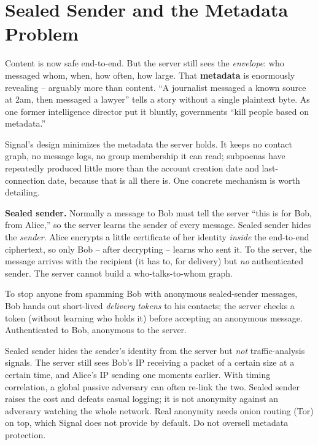 \section{Sealed Sender and the Metadata Problem}
\label{ch27:metadata}

Content is now safe end-to-end. But the server still sees the \emph{envelope}: who messaged whom, when, how often, how large. That \textbf{metadata} is enormously revealing -- arguably more than content. ``A journalist messaged a known source at 2am, then messaged a lawyer'' tells a story without a single plaintext byte. As one former intelligence director put it bluntly, governments ``kill people based on metadata.''

Signal's design minimizes the metadata the server holds. It keeps no contact graph, no message logs, no group membership it can read; subpoenas have repeatedly produced little more than the account creation date and last-connection date, because that is all there is. One concrete mechanism is worth detailing.

\begin{focusbox}
\textbf{Sealed sender.} Normally a message to Bob must tell the server ``this is for Bob, from Alice,'' so the server learns the sender of every message. Sealed sender hides the \emph{sender}. Alice encrypts a little certificate of her identity \emph{inside} the end-to-end ciphertext, so only Bob -- after decrypting -- learns who sent it. To the server, the message arrives with the recipient (it has to, for delivery) but \emph{no} authenticated sender. The server cannot build a who-talks-to-whom graph.

To stop anyone from spamming Bob with anonymous sealed-sender messages, Bob hands out short-lived \emph{delivery tokens} to his contacts; the server checks a token (without learning who holds it) before accepting an anonymous message. Authenticated to Bob, anonymous to the server.
\end{focusbox}

\begin{trapbox}
Sealed sender hides the sender's identity from the server but \emph{not} traffic-analysis signals. The server still sees Bob's IP receiving a packet of a certain size at a certain time, and Alice's IP sending one moments earlier. With timing correlation, a global passive adversary can often re-link the two. Sealed sender raises the cost and defeats casual logging; it is not anonymity against an adversary watching the whole network. Real anonymity needs onion routing (Tor) on top, which Signal does not provide by default. Do not oversell metadata protection.
\end{trapbox}

